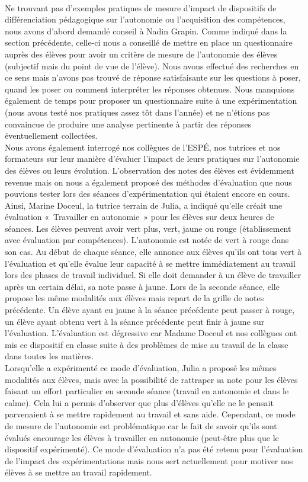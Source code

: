 \paragraph*{} Ne trouvant pas d'exemples pratiques de mesure d'impact de dispositifs de différenciation pédagogique sur l'autonomie ou l'acquisition des compétences, nous avons d'abord demandé conseil à Nadin Grapin. Comme indiqué dans la section précédente, celle-ci nous a conseillé de mettre en place un questionnaire auprès des élèves pour avoir un critère de mesure  de l'autonomie des élèves (subjectif mais du point de vue de l'élève). Nous avons effectué des recherches en ce sens mais n'avons pas trouvé de réponse satisfaisante sur les questions à poser, quand les poser ou comment interpréter les réponses obtenues. Nous manquions également de temps pour proposer un questionnaire suite à une expérimentation (nous avons testé nos pratiques assez tôt dans l'année) et ne n'étions pas convaincue de produire une analyse pertinente à partir des réponses éventuellement collectées.\\
Nous avons également interrogé nos collègues de l'ESPÉ, nos tutrices et nos formateurs sur leur manière d'évaluer l'impact de leurs pratiques sur l'autonomie des élèves ou leurs évolution. L'observation des notes des élèves est évidemment revenue mais on nous a également proposé des méthodes d'évaluation que nous pouvions tester lors des séances d'expérimentation qui étaient encore en cours.
Ainsi, Marine Doceul, la tutrice terrain de Julia, a indiqué qu'elle créait une évaluation « Travailler en autonomie » pour les élèves sur deux heures de séances. Les élèves peuvent avoir vert plus, vert, jaune ou rouge (établissement avec évaluation par compétences). L'autonomie est notée de vert à rouge dans son cas. Au début de chaque séance, elle annonce aux élèves qu'ils ont tous vert à l'évaluation et qu'elle évalue leur capacité à se mettre immédiatement au travail lors des phases de travail individuel. Si elle doit demander à un élève de travailler après un certain délai, sa note passe à jaune. Lors de la seconde séance, elle propose les même modalités aux élèves mais repart de la grille de notes précédente. Un élève ayant eu jaune à la séance précédente peut passer à rouge, un élève ayant obtenu vert à la séance précédente peut finir à jaune sur l'évaluation. L'évaluation est dégressive car Madame Doceul et nos collègues ont mis ce dispositif en classe suite à des problèmes de mise au travail de la classe dans toutes les matières.\\
Lorsqu'elle a expérimenté ce mode d'évaluation, Julia a proposé les mêmes modalités aux élèves, mais avec la possibilité de rattraper sa note pour les élèves faisant un effort particulier en seconde séance (travail en autonomie et dans le calme). Cela lui a permis d'observer que plus d'élèves qu'elle ne le pensait parvenaient à se mettre rapidement au travail et sans aide. Cependant, ce mode de mesure de l'autonomie est problématique car le fait de savoir qu'ils sont évalués encourage les élèves à travailler en autonomie (peut-être plus que le dispositif expérimenté). Ce mode d'évaluation n'a pas été retenu pour l'évaluation de l'impact des expérimentations mais nous sert actuellement pour motiver nos élèves à se mettre au travail rapidement.\\

